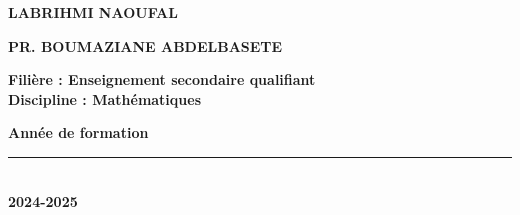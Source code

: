 \documentclass[a4paper,11pt]{report}
\begin{document}
\begin{titlepage}
\begin{center}
\begin{center}
            \vspace{0.2cm}
            \noindent
            \begin{minipage}{0.48\textwidth}
                \raggedright
                {\color{black}\large\bfseries LABRIHMI NAOUFAL}
            \end{minipage}%
            \begin{minipage}{0.48\textwidth}
                \raggedleft
                {\color{black}\large\bfseries PR. BOUMAZIANE ABDELBASETE}
            \end{minipage}
            
            \vspace{0.1cm}
            {\raggedright
            \bfseries \color{primary}Fili\`ere : \color{black}Enseignement secondaire qualifiant\\[0.2cm]
            \bfseries \color{primary}Discipline : \color{black}Math\'ematiques
            \par}
        \end{center}
        
        \vfill
        
        \begin{center}
            {\color{primary}\Large\bfseries Ann\'ee de formation}\\[0.2cm]
            {\color{primary}\rule{0.3\linewidth}{0.5mm}}\\[0.2cm]
            {\color{primary}\LARGE\bfseries 2024-2025}
        \end{center}
    \end{center}
\end{titlepage}

\cleardoublepage
\thispagestyle{plain}
\end{document}
